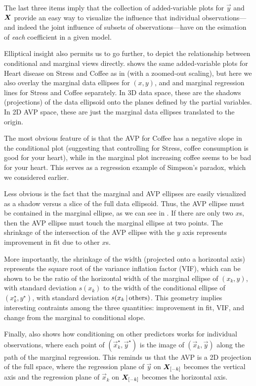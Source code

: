 \begin{enumerate*}
 \item The last three items imply that the collection of added-variable plots for $\vec{y}$ and
 $\bm{X}$ provide an easy way to visualize the influence that individual observations---and indeed the joint influence of subsets of observations---have on
 the esimation of \emph{each} coefficient in a given model.
\end{enumerate*}


Elliptical insight also permits us to go further, to depict the relationship between conditional and marginal views
directly.
 shows the same added-variable plots for Heart disease on Stress and Coffee
as in  (with a zoomed-out scaling), but here we also overlay the
marginal data ellipses for $(x, y)$,
and and marginal regression lines for Stress and Coffee separately.  In 3D data space,
these are the shadows (projections) of the data ellipsoid onto the planes defined by the
partial variables.  In 2D AVP space, these are just the marginal data ellipses translated to
the origin.

The most obvious feature of  is that the AVP for Coffee has a negative slope in the conditional
plot (suggesting that controlling for Stress, coffee consumption is good for your heart), while
in the marginal plot increasing coffee seems to be bad for your heart. This serves as a
regression example of Simpson's paradox, which we considered earlier.

Less obvious is the fact that
the marginal and AVP ellipses are easily visualized as a shadow versus a slice of the full data ellipsoid.
Thus, the AVP ellipse must be contained in the marginal ellipse, as we can see in .
If there are only two $x$s, then the AVP ellipse must touch the marginal ellipse at two points.
The shrinkage of the intersection of the AVP ellipse with the $y$ axis represents improvement in fit due to other $x$s.

More importantly, the shrinkage of the width (projected onto a horizontal axis) represents the
square root of the variance inflation factor (VIF), which can be shown to be the ratio of the horizontal
width of the marginal ellipse of $(x_k, y)$, with standard deviation $s(x_k)$ to the width of the conditional
ellipse of $(x_k^\star, y^\star)$, with standard deviation $s(x_k \, | \, \textrm{others})$.
This geometry implies interesting contraints among the three quantities: improvement in fit, VIF, and change from the marginal to conditional slope.

Finally,  also shows how conditioning on other predictors works for individual
observations, where each point of  $(\vec{x}_k^\star, \vec{y}^\star)$ is the image of $(\vec{x}_k, \vec{y})$
along the path of the marginal regression. This reminds us that the AVP is a 2D projection of the full space,
where the regression plane of $\vec{y}$ on $\bm{X}_{[-k]}$ becomes the vertical axis and
the regression plane of $\vec{x}_k$ on $\bm{X}_{[-k]}$ becomes the horizontal axis.

